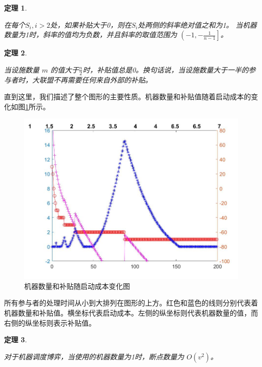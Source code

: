 \documentclass[UTF8]{article}
\newtheorem{thm}{\hspace{2em}定理}
\begin{document}
\begin{thm}\label{thm2}

在每个$S_i,i>2$处，如果补贴大于0，则在$S_i$处两侧的斜率绝对值之和为1。
当机器数量为1时，斜率的值均为负数，并且斜率的取值范围为 $\left(-1, -\frac{1}{n-1} \right]$。
\end{thm}

\begin{thm}\label{thm3}

当设施数量 $m$ 的值大于$\frac{n}{2}$时，补贴值总是0。换句话说，当设施数量大于一半的参与者时，大联盟不再需要任何来自外部的补贴。 \\
\end{thm}

直到这里，我们描述了整个图形的主要性质。机器数量和补贴值随着启动成本的变化如图\ref{fig:Image1}所示。

\begin{figure}[h]%
	\centering  %
	\includegraphics[width=0.8\linewidth]{Figures/Image30}  %
	\caption{机器数量和补贴随启动成本变化图}  %
	\label{fig:Image1}   %
\end{figure}

所有参与者的处理时间从小到大排列在图形的上方。红色和蓝色的线则分别代表着机器数量和补贴值。横坐标代表启动成本。左侧的纵坐标则代表机器数量的值，而右侧的纵坐标则表示补贴值。


\begin{thm}\label{thm4}

对于机器调度博弈，当使用的机器数量为1时，断点数量为 $O(v^2)$。
\end{thm}
\end{document}

